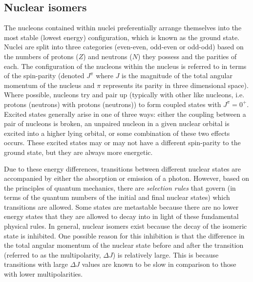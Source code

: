 \documentclass[12pt,a4paper]{article}
\begin{document}
\subsection*{Nuclear isomers}
\medskip
The nucleons contained within nuclei preferentially arrange themselves into the most stable (lowest energy) configuration, which is known as the ground state.
Nuclei are split into three categories (even-even, odd-even or odd-odd) based on the numbers of protons ($Z$) and neutrons ($N$) they possess and the parities of each.
The configuration of the nucleons within the nucleus is referred to in terms of the spin-parity (denoted $J^\pi$ where $J$ is the magnitude of the total angular momentum of the nucleus and $\pi$ represents its parity in three dimensional space). 
Where possible, nucleons try and pair up (typically with other like nucleons, i.e. protons (neutrons) with protons (neutrons)) to form coupled states with $J^\pi = 0^+$. 
Excited states generally arise in one of three ways: either the coupling between a pair of nucleons is broken, an unpaired nucleon in a given nuclear orbital is excited into a higher lying orbital, or some combination of these two effects occurs. 
These excited states may or may not have a different spin-parity to the ground state, but they are always more energetic.

\medskip
Due to these energy differences, transitions between different nuclear states are accompanied by either the absorption or emission of a photon. However, based on the principles of quantum mechanics, there are \textit{selection rules} that govern (in terms of the quantum numbers of the initial and final nuclear states) which transitions are allowed.
Some states are metastable because there are no lower energy states that they are allowed to decay into in light of these fundamental physical rules.
In general, nuclear isomers exist because the decay of the isomeric state is inhibited. 
One possible reason for this inhibition is that the difference in the total angular momentum of the nuclear state before and after the transition (referred to as the multipolarity, $\Delta J$) is relatively large.
This is because transitions with large $\Delta J$ values are known to be slow in comparison to those with lower multipolarities.
\end{document}
